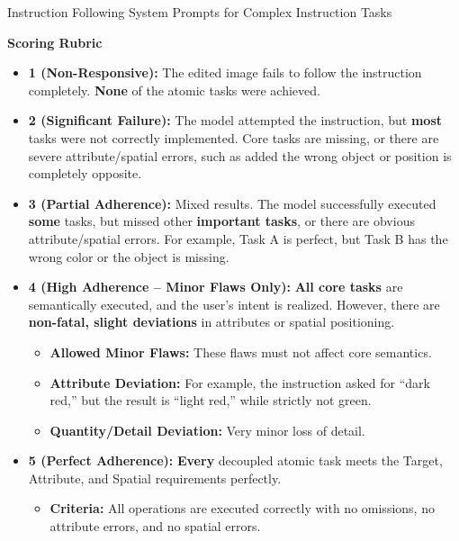\begin{promptbox}[label={System Prompts: IF_Complex_Instruction}]{Instruction Following System Prompts for Complex Instruction Tasks}
\medskip

\textbf{Scoring Rubric}

\begin{itemize}[leftmargin=2.2em, labelsep=0.4em, itemsep=2pt]
    \item \textbf{1 (Non-Responsive):} The edited image fails to follow the instruction completely. \textbf{None} of the atomic tasks were achieved.
    
    \item \textbf{2 (Significant Failure):} The model attempted the instruction, but \textbf{most} tasks were not correctly implemented. Core tasks are missing, or there are severe attribute/spatial errors, such as added the wrong object or position is completely opposite.
    
    \item \textbf{3 (Partial Adherence):} Mixed results. The model successfully executed \textbf{some} tasks, but missed other \textbf{important tasks}, or there are obvious attribute/spatial errors. For example, Task A is perfect, but Task B has the wrong color or the object is missing.
    
    \item \textbf{4 (High Adherence -- Minor Flaws Only):} \textbf{All core tasks} are semantically executed, and the user's intent is realized. However, there are \textbf{non-fatal, slight deviations} in attributes or spatial positioning.
    
    \begin{itemize}
        \item \textbf{Allowed Minor Flaws:} These flaws must not affect core semantics.
        
        \item \textbf{Attribute Deviation:} For example, the instruction asked for ``dark red,'' but the result is ``light red,'' while strictly not green.
        
        \item \textbf{Quantity/Detail Deviation:} Very minor loss of detail.
    \end{itemize}
    
    \item \textbf{5 (Perfect Adherence):} \textbf{Every} decoupled atomic task meets the Target, Attribute, and Spatial requirements perfectly.
    
    \begin{itemize}
        \item \textbf{Criteria:} All operations are executed correctly with no omissions, no attribute errors, and no spatial errors.
    \end{itemize}
\end{itemize}


\end{promptbox}
